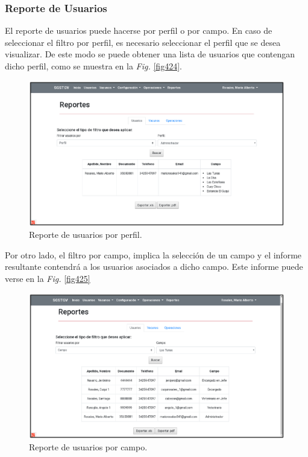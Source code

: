 \documentclass[11pt,oneside]{book}
\begin{document}
\newpage
\subsubsection{Reporte de Usuarios}
El reporte de usuarios puede hacerse por perfil o por campo. En caso de seleccionar el filtro por perfil, es necesario seleccionar el perfil que se desea visualizar. De este modo se puede obtener una lista de usuarios que contengan dicho perfil, como se muestra en la \textit{Fig.} \eqref{fig424}.
\begin{figure}[tbhp]
\centerline{\includegraphics[scale=0.87]{figs/capitulo_4_desarrollo/fig424.pdf}}
\caption{Reporte de usuarios por perfil.}
\label{fig424}
\end{figure}

Por otro lado, el filtro por campo, implica la selección de un campo y el informe resultante contendrá a los usuarios asociados a dicho campo. Este informe puede verse en la \textit{Fig.} \eqref{fig425}
\begin{figure}[tbhp]
\centerline{\includegraphics[scale=0.87]{figs/capitulo_4_desarrollo/fig425.pdf}}
\caption{Reporte de usuarios por campo.}
\label{fig425}
\end{figure}
\end{document}
